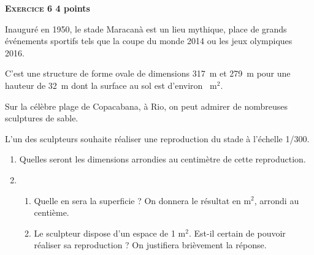 \textbf{\textsc{Exercice 6} \hfill 4 points}

\medskip

Inauguré en 1950, le stade Maracanà est un lieu
mythique, place de grands événements sportifs tels que
la coupe du monde 2014 ou les jeux olympiques 2016.

C'est une structure de forme ovale de dimensions 317~m
et 279~m pour une hauteur de 32~m dont la surface au sol
est d'environ ~m$^2$.

Sur la célèbre plage de Copacabana, à Rio, on peut admirer de nombreuses sculptures de
sable.

L'un des sculpteurs souhaite réaliser une reproduction du stade à l'échelle 1/300.

\medskip

\begin{enumerate}
\item Quelles seront les dimensions arrondies au centimètre de cette reproduction.
\item  
	\begin{enumerate}
		\item Quelle en sera la superficie ? On donnera le résultat en m$^2$, arrondi au centième.
		\item Le sculpteur dispose d'un espace de 1 m$^2$. Est-il certain de pouvoir réaliser sa
reproduction ? On justifiera brièvement la réponse.
	\end{enumerate}
\end{enumerate}

\vspace{0,5cm}

